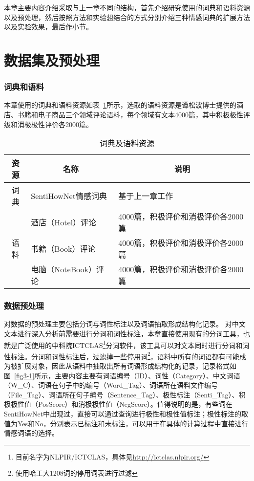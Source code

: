 本章主要内容介绍采取与上一章不同的结构，首先介绍研究使用的词典和语料资源以及预处理，然后按照方法和实验想结合的方式分别介绍三种情感词典的扩展方法以及实验效果，最后作小节。
\section{数据集及预处理}

\subsubsection{词典和语料}
本章使用的词典和语料资源如表~\ref{tab3-1}所示，选取的语料资源是谭松波博士提供的酒店、书籍和电子商品三个领域评论语料，每个领域有文本4000篇，其中积极极性评级和消极极性评价各2000篇。
\begin{table}[htp]
\centering
\caption{词典及语料资源}
\label{tab3-1}
\begin{tabular}{|c|l|l|}
\hline
资源 & \multicolumn{1}{c|}{名称} & \multicolumn{1}{c|}{说明} \\ \hline
词典 & SentiHowNet情感词典 & 基于上一章工作 \\ \hline
\multirow{3}{*}{语料} & 酒店（Hotel）评论 & 4000篇，积极评价和消极评价各2000篇 \\ \cline{2-3} 
 & 书籍（Book）评论 & 4000篇，积极评价和消极评价各2000篇 \\ \cline{2-3} 
 & 电脑（NoteBook）评论 & 4000篇，积极评价和消极评价各2000篇 \\ \hline
\end{tabular}
\end{table}

\subsubsection{数据预处理}
对数据的预处理主要包括分词与词性标注以及词语抽取形成结构化记录。
对中文文本进行深入分析前需要进行分词和词性标注，本章直接使用现有的分词工具，也就是广泛使用的中科院ICTCLAS\footnote{目前名字为NLPIR/ICTCLAS，具体见\url{http://ictclas.nlpir.org/}}分词软件，该工具可以对文本同时进行分词和词性标注。分词和词性标注后，过滤掉一些停用词\footnote{使用哈工大1208词的停用词表进行过滤}，语料中所有的词语都有可能成为被扩展对象，因此从语料中抽取出所有词语形成结构化的记录，记录格式如图~\ref{fig3-1}所示，主要内容主要有词语编号（ID）、词性（Category）、中文词语（W\_C）、词语在句子中的编号（Word\_Tag）、词语所在语料文件编号（File\_Tag）、词语所在句子编号（Sentence\_Tag）、极性标注（Senti\_Tag）、积极极性值（PosScore）和消极极性值（NegScore）。值得说明的是，有些词在SentiHowNet中出现过，直接可以通过查询进行极性和极性值标注；极性标注的取值为Yes和No，分别表示已标注和未标注，可以用于在具体的计算过程中直接进行情感词语的选择。

